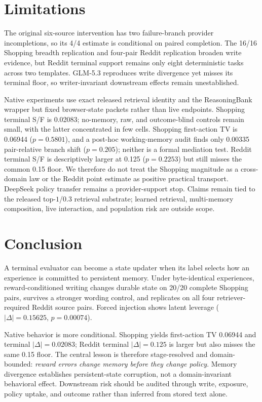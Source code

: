 \section{Limitations}
The original six-source intervention has two failure-branch provider incompletions, so its 4/4 estimate is conditional on paired completion. The 16/16 Shopping breadth replication and four-pair Reddit replication broaden write evidence, but Reddit terminal support remains only eight deterministic tasks across two templates. GLM-5.3 reproduces write divergence yet misses its terminal floor, so writer-invariant downstream effects remain unestablished.

Native experiments use exact released retrieval identity and the ReasoningBank wrapper but fixed browser-state packets rather than live endpoints. Shopping terminal S/F is 0.02083; no-memory, raw, and outcome-blind controls remain small, with the latter concentrated in few cells. Shopping first-action TV is 0.06944 ($p=0.5801$), and a post-hoc working-memory audit finds only 0.00335 pair-relative branch shift ($p=0.205$); neither is a formal mediation test. Reddit terminal S/F is descriptively larger at 0.125 ($p=0.2253$) but still misses the common 0.15 floor. We therefore do not treat the Shopping magnitude as a cross-domain law or the Reddit point estimate as positive practical transport. DeepSeek policy transfer remains a provider-support stop. Claims remain tied to the released top-$1$/0.3 retrieval substrate; learned retrieval, multi-memory composition, live interaction, and population risk are outside scope.

\section{Conclusion}
A terminal evaluator can become a state updater when its label selects how an experience is committed to persistent memory. Under byte-identical experiences, reward-conditioned writing changes durable state on 20/20 complete Shopping pairs, survives a stronger wording control, and replicates on all four retriever-required Reddit source pairs. Forced injection shows latent leverage ($|\Delta|=0.15625$, $p=0.00074$).

Native behavior is more conditional. Shopping yields first-action TV 0.06944 and terminal $|\Delta|=0.02083$; Reddit terminal $|\Delta|=0.125$ is larger but also misses the same 0.15 floor. The central lesson is therefore stage-resolved and domain-bounded: \emph{reward errors change memory before they change policy}. Memory divergence establishes persistent-state corruption, not a domain-invariant behavioral effect. Downstream risk should be audited through write, exposure, policy uptake, and outcome rather than inferred from stored text alone.
